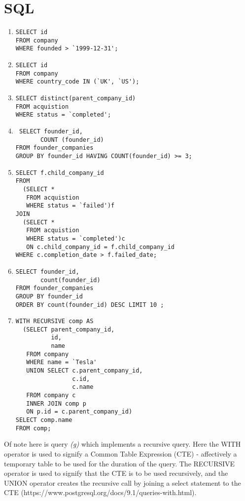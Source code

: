 \documentclass[12pt]{article}
\begin{document}
\section{SQL}
\begin{enumerate}

 \item\label{part1}\begin{verbatim}SELECT id
FROM company
WHERE founded > `1999-12-31';\end{verbatim}

  \item\label{part1}\begin{verbatim}SELECT id
FROM company
WHERE country_code IN (`UK', `US');\end{verbatim}
  \item\label{part1}\begin{verbatim}SELECT distinct(parent_company_id)
FROM acquistion
WHERE status = `completed';\end{verbatim}
  \item\label{part1}\begin{verbatim} SELECT founder_id,
       COUNT (founder_id)
FROM founder_companies
GROUP BY founder_id HAVING COUNT(founder_id) >= 3;\end{verbatim}
  \item\label{part1}\begin{verbatim}SELECT f.child_company_id
FROM
  (SELECT *
   FROM acquistion
   WHERE status = `failed')f
JOIN
  (SELECT *
   FROM acquistion
   WHERE status = `completed')c
   ON c.child_company_id = f.child_company_id
WHERE c.completion_date > f.failed_date;\end{verbatim}
  \item\label{part1}\begin{verbatim}SELECT founder_id,
       count(founder_id)
FROM founder_companies
GROUP BY founder_id
ORDER BY count(founder_id) DESC LIMIT 10 ;\end{verbatim}
  \item\label{part1}\begin{verbatim}WITH RECURSIVE comp AS
  (SELECT parent_company_id,
          id,
          name
   FROM company
   WHERE name = `Tesla'
   UNION SELECT c.parent_company_id,
                c.id,
                c.name
   FROM company c
   INNER JOIN comp p
   ON p.id = c.parent_company_id)
SELECT comp.name
FROM comp;\end{verbatim}
\end{enumerate}

Of note here is query \emph{(g)} which implements a recursive query. Here the WITH operator is used to signify a Common Table Expression (CTE) - affectively a temporary table to be used for the duration of the query. The RECURSIVE operator is used to signify that the CTE is to be used recursively, and the UNION operator creates the recursive call by joining a select statement to the CTE (https://www.postgresql.org/docs/9.1/queries-with.html).
\end{document}
